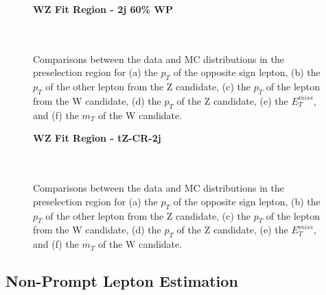 \begin{figure}[H] 
    \centering
    \textbf{WZ Fit Region - 2j 60\% WP}\\
    \\
    \\
    \caption{Comparisons between the data and MC distributions in the preselection region for (a) the $p_T$ of the opposite sign lepton, (b) the $p_T$ of the other lepton from the Z candidate, (c) the $p_T$ of the lepton from the W candidate, (d) the $p_T$ of the Z candidate, (e) the $E_T^{miss}$, and (f) the $m_T$ of the W candidate.}
    \label{kin:WP_2j_60}
\end{figure}

\begin{figure}[H] 
    \textbf{WZ Fit Region - tZ-CR-2j}\\
    \\
    \\
    \caption{Comparisons between the data and MC distributions in the preselection region for (a) the $p_T$ of the opposite sign lepton, (b) the $p_T$ of the other lepton from the Z candidate, (c) the $p_T$ of the lepton from the W candidate, (d) the $p_T$ of the Z candidate, (e) the $E_T^{miss}$, and (f) the $m_T$ of the W candidate.}
    \label{kin:tZ_CR_2j}
\end{figure}

\subsection{Non-Prompt Lepton Estimation}
\label{sec:fakes}

